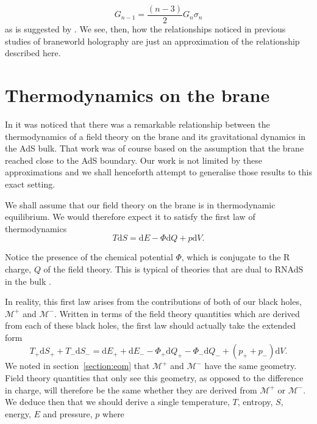 \documentclass[a4paper,12pt]{article}
\begin{document}
\begin{equation} \label{eqn:newton}
G_{n-1}=\frac{(n-3)}{2}G_n \sigma_n
\end{equation}
as is suggested by
\cite{Randall:compactification,Shiromizu:3brane,Uchida:radion,Gregory:nested,Gregory:instantons,
Singh:local}. We see, then, how the relationships noticed in previous
studies of braneworld holography are just an approximation of the
relationship described here.

\section{Thermodynamics on the brane} \label{section:thermodynamics}

In \cite{Savonije:braneCFT} it was noticed that there was a remarkable
relationship between the thermodynamics of a field theory on the brane
and its gravitational dynamics in the AdS bulk. That work was of
course based on the assumption that the brane reached close to the AdS
boundary. Our work is not limited by these approximations and we shall
henceforth attempt to generalise those results to this exact setting.

We shall assume that our field theory on the brane is in thermodynamic
equilibrium. We would therefore expect it to satisfy the first law of
thermodynamics
\begin{equation} \label{eqn:firstlaw}
T\mathrm{d}S = \mathrm{d}E - \Phi \mathrm{d}Q + p\mathrm{d}V.
\end{equation}

Notice the presence of the chemical potential $\Phi$, which is
conjugate to the R charge, $Q$ of the field theory. This is typical of
theories that are dual to RNAdS in the bulk \cite{Cvetic:rcharge}.

In reality, this first law arises from the contributions of both of
our black holes, $\mathcal{M}^+$ and $\mathcal{M}^-$.  Written in
terms of the field theory quantities which are derived from each of
these black holes, the first law should actually take the extended form
\begin{equation}
T_+\mathrm{d}S_+ + T_-\mathrm{d}S_- = \mathrm{d}E_+ + \mathrm{d}E_- -
\Phi_+ \mathrm{d}Q_+ - \Phi_- \mathrm{d}Q_- + (p_+ + p_-)\mathrm{d}V.
\end{equation}
We noted in section~\ref{section:eom} that $\mathcal{M}^+$ and
$\mathcal{M}^-$ have the same geometry. Field theory quantities that
only see this geometry, as opposed to the difference in charge, will
therefore be the same whether they are derived from  $\mathcal{M}^+$
or $\mathcal{M}^-$. We deduce then that we should derive a single
temperature, $T$, entropy, $S$, energy, $E$ and pressure, $p$ where
\end{document}
